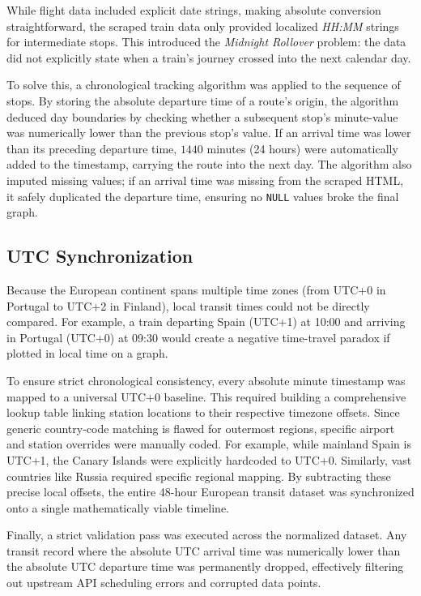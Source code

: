 While flight data included explicit date strings, making absolute conversion straightforward, the scraped train data only provided localized \textit{HH:MM} strings for intermediate stops. This introduced the \textit{Midnight Rollover} problem: the data did not explicitly state when a train's journey crossed into the next calendar day.

To solve this, a chronological tracking algorithm was applied to the sequence of stops. By storing the absolute departure time of a route's origin, the algorithm deduced day boundaries by checking whether a subsequent stop's minute-value was numerically lower than the previous stop's value. If an arrival time was lower than its preceding departure time, $1440$ minutes (24 hours) were automatically added to the timestamp, carrying the route into the next day. The algorithm also imputed missing values; if an arrival time was missing from the scraped HTML, it safely duplicated the departure time, ensuring no \texttt{NULL} values broke the final graph.

\subsection{UTC Synchronization}
\label{subsec:utc_synchronization}
Because the European continent spans multiple time zones (from UTC+0 in Portugal to UTC+2 in Finland), local transit times could not be directly compared. For example, a train departing Spain (UTC+1) at 10:00 and arriving in Portugal (UTC+0) at 09:30 would create a negative time-travel paradox if plotted in local time on a graph.

To ensure strict chronological consistency, every absolute minute timestamp was mapped to a universal UTC+0 baseline. This required building a comprehensive lookup table linking station locations to their respective timezone offsets. Since generic country-code matching is flawed for outermost regions, specific airport and station overrides were manually coded. For example, while mainland Spain is UTC+1, the Canary Islands were explicitly hardcoded to UTC+0. Similarly, vast countries like Russia required specific regional mapping. By subtracting these precise local offsets, the entire 48-hour European transit dataset was synchronized onto a single mathematically viable timeline.

Finally, a strict validation pass was executed across the normalized dataset. Any transit record where the absolute UTC arrival time was numerically lower than the absolute UTC departure time was permanently dropped, effectively filtering out upstream API scheduling errors and corrupted data points.

